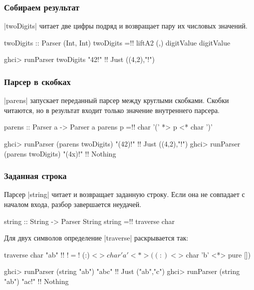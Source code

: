 \documentclass[11pt]{beamer}
\begin{document}
\begin{frame}[fragile]
  \frametitle{Собираем результат}
  \haskinline|twoDigits| читает две цифры подряд и возвращает пару их числовых значений.
  \pause
  \begin{haskell}
    twoDigits :: Parser (Int, Int)
    twoDigits =!\pause! liftA2 (,) digitValue digitValue
  \end{haskell}
  \begin{haskellsmall}
    ghci> runParser twoDigits "42!" !\pause!
    Just ((4,2),"!")
  \end{haskellsmall}
\end{frame}

\begin{frame}[fragile]
  \frametitle{Парсер в скобках}
  \haskinline|parens| запускает переданный парсер между круглыми скобками. Скобки читаются, но в результат входит только значение внутреннего парсера.
  \pause
  \begin{haskell}
    parens :: Parser a -> Parser a
    parens p =!\pause! char '(' *> p <* char ')'
  \end{haskell}
  \begin{haskellsmall}
    ghci> runParser (parens twoDigits) "(42)!" !\pause!
    Just ((4,2),"!")
    ghci> runParser (parens twoDigits) "(4x)!" !\pause!
    Nothing
  \end{haskellsmall}
\end{frame}

\begin{frame}[fragile]
  \frametitle{Заданная строка}
  Парсер \haskinline|string| читает и возвращает заданную строку. Если она не совпадает с началом входа, разбор завершается неудачей.
  \pause
  \begin{haskellsmall}
    string :: String -> Parser String
    string =!\pause! traverse char
  \end{haskellsmall}
  \pause
  Для двух символов определение \haskinline|traverse| раскрывается так:
  \begin{haskellsmall}
    traverse char "ab" !\pause!
      !$=$! (:) <$> char 'a'
            <*> ((:) <$> char 'b' <*> pure [])
  \end{haskellsmall}
  \begin{haskellsmall}
    ghci> runParser (string "ab") "abc" !\pause!
    Just ("ab","c")
    ghci> runParser (string "ab") "ac!" !\pause!
    Nothing
  \end{haskellsmall}
\end{frame}
\end{document}
